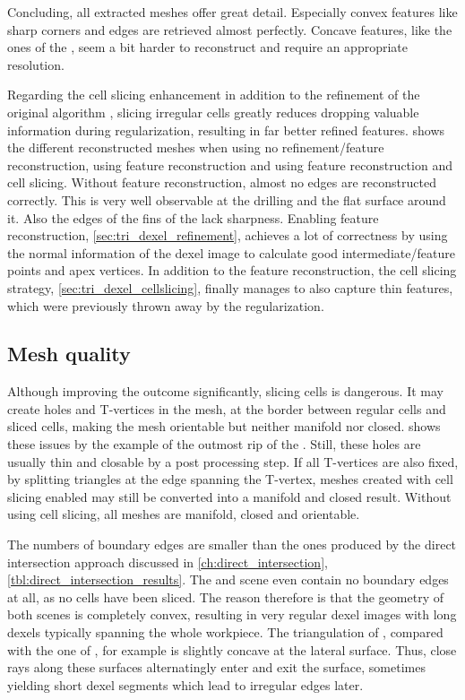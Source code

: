 Concluding, all extracted meshes offer great detail.
Especially convex features like sharp corners and edges are retrieved almost perfectly.
Concave features, like the ones of the \turbine, seem a bit harder to reconstruct and require an appropriate resolution.

Regarding the cell slicing enhancement in addition to the refinement of the original algorithm \cite{tridexel_reconstruction}, slicing irregular cells greatly reduces dropping valuable information during regularization, resulting in far better refined features.
 shows the different reconstructed meshes when using no refinement/feature reconstruction, using feature reconstruction and using feature reconstruction and cell slicing.
Without feature reconstruction, almost no edges are reconstructed correctly.
This is very well observable at the drilling and the flat surface around it.
Also the edges of the fins of the \cylinderhead lack sharpness.
Enabling feature reconstruction, \cf \cref{sec:tri_dexel_refinement}, achieves a lot of correctness by using the normal information of the dexel image to calculate good intermediate/feature points and apex vertices.
In addition to the feature reconstruction, the cell slicing strategy, \cf \cref{sec:tri_dexel_cellslicing}, finally manages to also capture thin features, which were previously thrown away by the regularization.


\subsection{Mesh quality}

Although improving the outcome significantly, slicing cells is dangerous.
It may create holes and T-vertices in the mesh, at the border between regular cells and sliced cells, making the mesh orientable but neither manifold nor closed.
 shows these issues by the example of the outmost rip of the \cylinderhead.
Still, these holes are usually thin and closable by a post processing step.
If all T-vertices are also fixed, \eg by splitting triangles at the edge spanning the T-vertex, meshes created with cell slicing enabled may still be converted into a manifold and closed result.
Without using cell slicing, all meshes are manifold, closed and orientable.

The numbers of boundary edges are smaller than the ones produced by the direct intersection approach discussed in \cref{ch:direct_intersection}, \cf \cref{tbl:direct_intersection_results}.
The \cubes and \cylinders scene even contain no boundary edges at all, as no cells have been sliced.
The reason therefore is that the geometry of both scenes is completely convex, resulting in very regular dexel images with long dexels typically spanning the whole workpiece.
The triangulation of \cylindersd, compared with the one of \cylinders, for example is slightly concave at the lateral surface.
Thus, close rays along these surfaces alternatingly enter and exit the surface, sometimes yielding short dexel segments which lead to irregular edges later.

